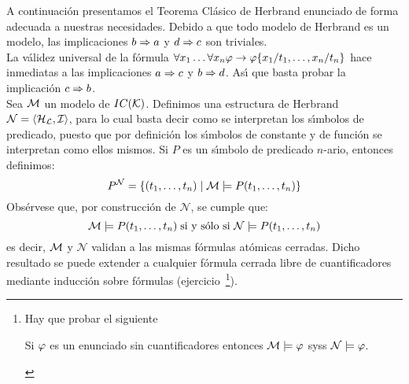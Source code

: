 \documentclass[11pt,letterpaper]{article}
\begin{document}
A continuaci\'on presentamos el Teorema Cl\'asico de Herbrand enunciado de 
forma adecuada a nuestras necesidades.
\proof
Debido a que todo modelo de Herbrand es un modelo, las implicaciones
$b\Rightarrow a$ y $d\Rightarrow c$ son triviales.\\ La v\'alidez universal de la
f\'ormula $\forall x_1\ldots\forall x_n\varphi\rightarrow \varphi\{x_1/t_1,\ldots,x_n/t_n\}$ hace
inmediatas a las implicaciones $a\Rightarrow c$ y $b\Rightarrow d$. 
As\'{\i} que basta probar la implicaci\'on $c\Rightarrow b$.  \\
Sea $\mathcal{M}$ un modelo de $IC(\mathcal{K})$. Definimos una estructura de Herbrand 
$\mathcal{N}=\langle \mathcal{H}_{\mathcal{L}},\mathcal{I} \rangle$, para lo cual basta decir como se interpretan los 
s\'{\i}mbolos de predicado, puesto que por definici\'on los s\'{\i}mbolos de 
constante y de funci\'on se interpretan como ellos mismos. Si $P$ es un 
s\'{\i}mbolo de predicado $n$-ario, entonces definimos:  
$$P^\mathcal{N}=\{(t_1,\ldots,t_n)\mid \mathcal{M}\models P(t_1,\ldots,t_n) \} $$  
Obs\'ervese que, por construcci\'on de $\mathcal{N}$, se cumple que: 
$$
\mathcal{M}\models P(t_1,\ldots,t_n)\;\text{si  y s\'olo si } \mathcal{N}\models 
P(t_1,\ldots,t_n)
$$
es decir, $\mathcal{M}$ y $\mathcal{N}$ validan a las mismas f\'ormulas at\'omicas
cerradas. Dicho resultado se puede extender a cualquier f\'ormula cerrada
libre de cuantificadores mediante inducci\'on sobre f\'ormulas 
(ejercicio~\footnote{Hay que probar el siguiente \begin{lemma}Si $\varphi$ es un 
enunciado sin cuantificadores entonces $\mathcal{M}\models\varphi$ syss 
$\mathcal{N}\models\varphi$.\end{lemma}}).
\end{document}
